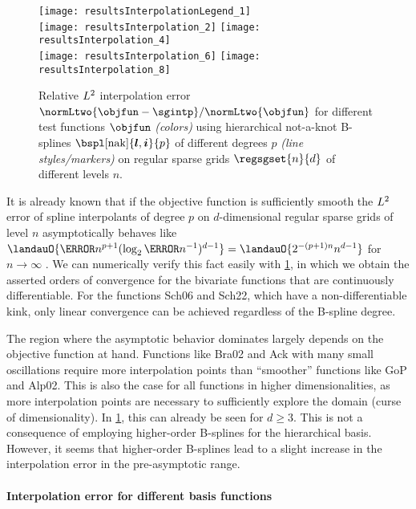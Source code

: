 \begin{figure}
  \texttt{[image: resultsInterpolationLegend\_1]}\\[2mm]%
  \texttt{[image: resultsInterpolation\_2]}%
  \hfill%
  \texttt{[image: resultsInterpolation\_4]}%
  \\[2mm]%
  \texttt{[image: resultsInterpolation\_6]}%
  \hfill%
  \texttt{[image: resultsInterpolation\_8]}%
  \caption[Relative interpolation error for different test functions]{%
    Relative $L^2$ interpolation error
    $\normLtwo{\objfun - \sgintp}/\normLtwo{\objfun}$
    for different test functions $\objfun$ \emph{(colors)}
    using hierarchical not-a-knot B-splines
    $\bspl[\nak]{\*l,\*i}{p}$ of different degrees $p$
    \emph{(line styles/markers)} on
    regular sparse grids $\regsgset{n}{d}$ of different levels $n$.%
  }%
  \label{fig:resultsInterpolationErrorTestFunctions}%
\end{figure}

It is already known that
if the objective function is sufficiently smooth
the $L^2$ error of spline interpolants of degree $p$ on
$d$-dimensional regular sparse grids of level $n$
asymptotically behaves like
$\landauO{\ms{n}^{p+1} (\log_2 \ms{n}^{-1})^{d-1}}
= \landauO{2^{-(p+1)n} n^{d-1}}$ for $n \to \infty$ \cite{Sickel11Spline}.
We can numerically verify this fact easily with
\cref{fig:resultsInterpolationErrorTestFunctions},
in which we obtain the asserted orders of convergence
for the bivariate functions that are continuously differentiable.
For the functions Sch06 and Sch22, which have a non-differentiable kink,
only linear convergence can be achieved regardless of the B-spline degree.

The region where the asymptotic behavior dominates largely depends
on the objective function at hand.
Functions like Bra02 and Ack with many small oscillations
require more interpolation points than ``smoother'' functions like
GoP and Alp02.
This is also the case for all functions in higher dimensionalities,
as more interpolation points are necessary to sufficiently explore the domain
(curse of dimensionality).
In \cref{fig:resultsInterpolationErrorTestFunctions}, this can already be seen
for $d \ge 3$.
This is not a consequence of employing higher-order B-splines for
the hierarchical basis.
However, it seems that higher-order B-splines lead to a slight increase
in the interpolation error in the pre-asymptotic range.

\paragraph{Interpolation error for different basis functions}

